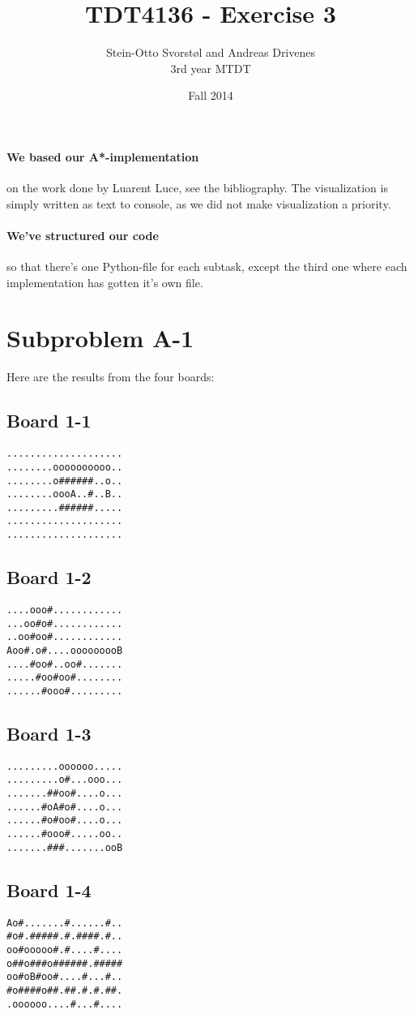 \documentclass[11pt,a4paper]{article}
\author{Stein-Otto Svorstøl and Andreas Drivenes
\\3rd year MTDT}
\title{TDT4136 - Exercise 3}
\date{Fall 2014}
\begin{document}
\maketitle
\paragraph{We based our A*-implementation} on the work done by Luarent Luce, see the bibliography. \cite{a-star-impl}
The visualization is simply written as text to console, as we did not make visualization a priority.

\paragraph{We've structured our code} so that there's one Python-file for each subtask, except the third one where each implementation has gotten it's own file.

\section*{Subproblem A-1}
Here are the results from the four boards:
\subsection*{Board 1-1}
\begin{lstlisting}
....................
........oooooooooo..
........o######..o..
........oooA..#..B..
.........######.....
....................
....................
\end{lstlisting}
\subsection*{Board 1-2}
\begin{lstlisting}
....ooo#............
...oo#o#............
..oo#oo#............
Aoo#.o#....ooooooooB
....#oo#..oo#.......
.....#oo#oo#........
......#ooo#.........
\end{lstlisting}
\subsection*{Board 1-3}
\begin{lstlisting}
.........oooooo.....
.........o#...ooo...
.......##oo#....o...
......#oA#o#....o...
......#o#oo#....o...
......#ooo#.....oo..
.......###.......ooB
\end{lstlisting}
\subsection*{Board 1-4}
\begin{lstlisting}
Ao#.......#......#..
#o#.#####.#.####.#..
oo#ooooo#.#....#....
o##o###o######.#####
oo#oB#oo#....#...#..
#o####o##.##.#.#.##.
.oooooo....#...#....
\end{lstlisting}
\end{document}
